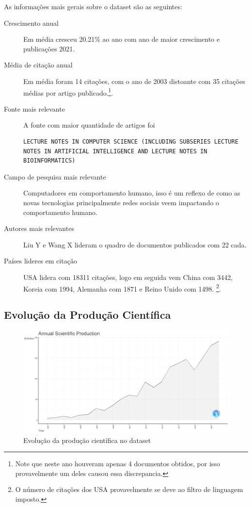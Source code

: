 As informações mais gerais sobre o dataset são as seguintes:
\begin{description}
    \item [Crescimento anual] Em média cresceu 20.21\% ao ano com ano de maior crescimento e publicações 2021.
    \item [Média de citação anual] Em média foram 14 citações, com o ano de 2003 distoante com 35 citações médias por artigo publicado.\footnote{Note que neste ano houveram apenas 4 documentos obtidos, por isso provavelmente um deles causou essa discrepancia.}.
    \item [Fonte mais relevante] A fonte com maior quantidade de artigos foi \begin{verbatim}
LECTURE NOTES IN COMPUTER SCIENCE (INCLUDING SUBSERIES LECTURE NOTES IN ARTIFICIAL INTELLIGENCE AND LECTURE NOTES IN BIOINFORMATICS)
\end{verbatim}
    \item [Campo de pesquisa mais relevante] Computadores em comportamento humano, isso é um reflexo de como as novas tecnologias principalmente redes sociais veem impactando o comportamento humano.
    \item [Autores mais relevantes] Liu Y e Wang X lideram o quadro de documentos publicados com 22 cada.
    \item [Países lideres em citação] USA lidera com 18311 citações, logo em seguida vem China com 3442, Koreia com 1994, Alemanha com 1871 e Reino Unido com 1498. \footnote{O número de citações dos USA provavelmente se deve ao filtro de linguagem imposto.}.
\end{description}

\subsection{Evolução da Produção Científica}

\begin{figure}
    \centering
    \includegraphics[width=1\textwidth]{exploratory-data-analysis/gabrielligoski/PesqBibliogr/ColorPatches/AnnualScientificProduction-2022-12-06.png}
    \caption{Evolução da produção científica no dataset}
    \label{fig:evol:anual:gabrielligoski}
\end{figure}

